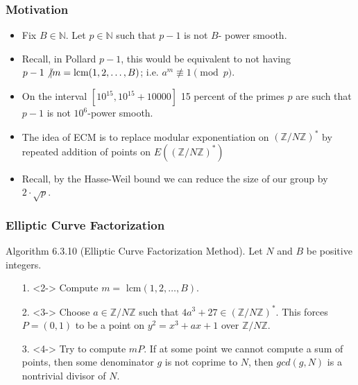 \documentclass{beamer}
\begin{document}
\begin{frame}
\frametitle{Motivation}

\begin{itemize}
\item<2-> Fix $B \in \mathbb{N}$. Let $p \in \mathbb{N}$ such that $p-1$ is not $B$- power smooth.

\item<3-> Recall, in Pollard $p-1$, this would be equivalent to not having $p-1 \not \vert m = \text{lcm}(1,2, \ldots, B)$; i.e. $a^m \not \equiv 1 \pmod{p}$.

\item<4-> On the interval $[10^{15}, 10^{15} + 10000]$ 15 percent of the primes $p$ are such that $p-1$ is not $10^{6}$-power smooth.

\item<5-> The idea of ECM is to replace modular exponentiation on $\left(\mathbb{Z}/N\mathbb{Z}\right)^*$ by repeated addition of points on $E\left(\left(\mathbb{Z}/N\mathbb{Z}\right)^*\right)$

\item<6-> Recall, by the Hasse-Weil bound we can reduce the size of our group by $2\cdot \sqrt{p}$.
\end{itemize}
\end{frame}

\begin{frame}
\frametitle{Elliptic Curve Factorization}

Algorithm 6.3.10 (Elliptic Curve Factorization Method). Let $N$ and $B$ be positive integers.
\begin{itemize}
\item[1.]<2-> Compute $m =$ lcm$(1,2,\ldots, B)$.
\item[2.]<3-> Choose $a \in \mathbb{Z}/N\mathbb{Z}$ such that $4a^3 + 27 \in \left(\mathbb{Z}/N\mathbb{Z}\right)^*$. This forces $P = (0,1)$ to be a point on $y^2 = x^3 + ax +1$ over $\mathbb{Z}/N\mathbb{Z}$.
\item[3.]<4-> Try to compute $mP$. If at some point we cannot compute a sum of points, then some denominator $g$ is not coprime to $N$, then $gcd(g,N)$ is a nontrivial divisor of $N$.
\end{itemize}
\end{frame}
\end{document}
